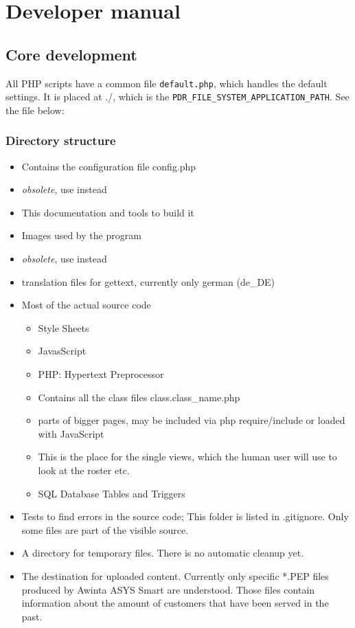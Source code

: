 \chapter{Developer manual}


\section{Core development}
All PHP scripts have a common file \texttt{default.php}, which handles the default settings. It is placed at ./, which is the \texttt{PDR\_FILE\_SYSTEM\_APPLICATION\_PATH}.
See the file below:


\subsection{Directory structure}
\begin{itemize}
\item {} Contains the configuration file config.php
\item {} \emph{obsolete}, use  instead
\item {} This documentation and tools to build it
\item {} Images used by the program
\item {}  \emph{obsolete}, use  instead
\item {} translation files for gettext, currently only german (de\_DE)
\item {} Most of the actual source code
    \begin{itemize}
    \item {} Style Sheets
    \item {} JavasScript
    \item {} PHP: Hypertext Preprocessor
    \item {} Contains all the class files class.class\_name.php
    \item {} parts of bigger pages, may be included via php require/include or loaded with JavaScript
    \item {} This is the place for the single views, which the human user will use to look at the roster etc.
    \item {} SQL Database Tables and Triggers
    \end{itemize}
\item {} Tests to find errors in the source code; This folder is listed in .gitignore. Only some files are part of the visible source.
\item {} A directory for temporary files. There is no automatic cleanup yet.
\item {} The destination for uploaded content. Currently only specific *.PEP files produced by Awinta ASYS Smart are understood. Those files contain information about the amount of customers that have been served in the past.
\end{itemize}

